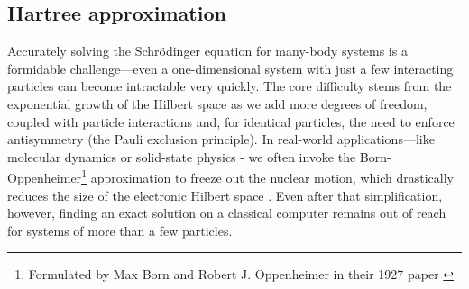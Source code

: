 \documentclass{subfiles}
\begin{document}



\subsection{Hartree approximation}\label{sec:hartree_theory}
Accurately solving the Schrödinger equation for many-body systems is a formidable challenge—even a one-dimensional system with just a few interacting particles can become intractable very quickly. The core difficulty stems from the exponential growth of the Hilbert space as we add more degrees of freedom, coupled with particle interactions and, for identical particles, the need to enforce antisymmetry (the Pauli exclusion principle). In real-world applications—like molecular dynamics or solid-state physics - we often invoke the Born-Oppenheimer\footnote{Formulated by Max Born and Robert J. Oppenheimer in their 1927 paper \cite{Born_Oppenheimer_1927}} approximation to freeze out the nuclear motion, which drastically reduces the size of the electronic Hilbert space \cite{helgaker2013molecular, szabo1996modern}. Even after that simplification, however, finding an exact solution on a classical computer remains out of reach for systems of more than a few particles.
\\ 
\end{document}
